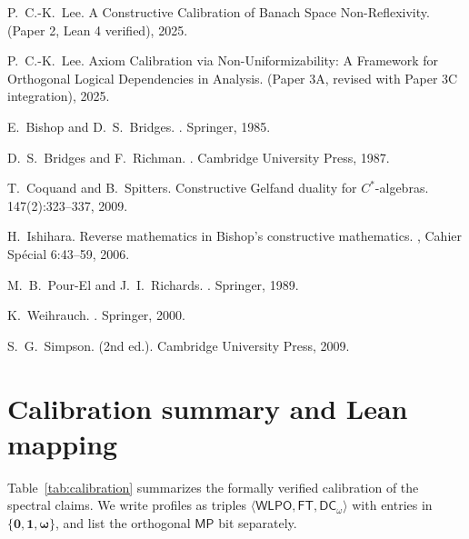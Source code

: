 \documentclass[11pt]{article}
\newcommand{\WLPO}{\mathsf{WLPO}}
\newcommand{\FT}{\mathsf{FT}}
\newcommand{\DCw}{\mathsf{DC}_{\omega}}
\newcommand{\MP}{\mathsf{MP}}
\newcommand{\hzero}{\mathbf{0}}
\newcommand{\hone}{\mathbf{1}}
\newcommand{\homega}{\boldsymbol{\omega}}
\theoremstyle{plain}
\theoremstyle{definition}
\theoremstyle{remark}
\begin{document}

\begin{thebibliography}{99}

P.~C.-K.~Lee.
\newblock A Constructive Calibration of Banach Space Non-Reflexivity.
\newblock (Paper 2, Lean 4 verified), 2025.

P.~C.-K.~Lee.
\newblock Axiom Calibration via Non-Uniformizability: A Framework for Orthogonal Logical Dependencies in Analysis.
\newblock (Paper 3A, revised with Paper 3C integration), 2025.

E.~Bishop and D.~S.~Bridges.
.
\newblock Springer, 1985.

D.~S.~Bridges and F.~Richman.
.
\newblock Cambridge University Press, 1987.

T.~Coquand and B.~Spitters.
\newblock Constructive Gelfand duality for $C^*$-algebras.
 147(2):323--337, 2009.

H.~Ishihara.
\newblock Reverse mathematics in {B}ishop's constructive mathematics.
, Cahier Sp\'ecial 6:43--59, 2006.

M.~B.~Pour-El and J.~I.~Richards.
.
\newblock Springer, 1989.

K.~Weihrauch.
.
\newblock Springer, 2000.

S.~G.~Simpson.
 (2nd ed.).
\newblock Cambridge University Press, 2009.

\end{thebibliography}


\section{Calibration summary and Lean mapping}\label{sec:calibration-summary}
Table~\ref{tab:calibration} summarizes the formally verified calibration of the
spectral claims. We write profiles as triples \(\langle \WLPO,\FT,\DCw\rangle\) with
entries in \(\{\hzero,\hone,\homega\}\), and list the orthogonal \(\MP\) bit separately.
\end{document}

